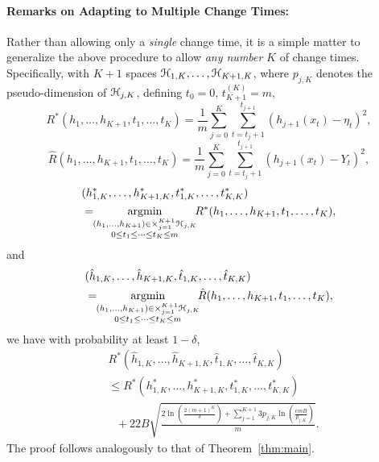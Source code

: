 \documentclass{article}
\begin{document}
\paragraph{Remarks on Adapting to Multiple Change Times:}
Rather than allowing only a \emph{single} change time, it is a simple matter to generalize the above
procedure to allow \emph{any number} $K$ of change times.  Specifically, with $K+1$ spaces $\mathcal H_{1,K},\ldots,\mathcal H_{K+1,K}$,
where $p_{j,K}$ denotes the pseudo-dimension of $\mathcal H_{j,K}$,
defining $t_{0} = 0$, $t_{K+1}^{(K)} = m$, 
\begin{equation*}
R^{*}(h_{1},\ldots,h_{K+1},t_{1},\ldots,t_{K}) 
= \frac{1}{m} \sum_{j = 0}^{K} \sum_{t=t_{j}+1}^{t_{j+1}} ( h_{j+1}(x_{t}) - \eta_{t} )^{2},
\end{equation*}
\begin{equation*}
\hat{R}(h_{1},\ldots,h_{K+1},t_{1},\ldots,t_{K}) 
= \frac{1}{m} \sum_{j=0}^{K} \sum_{t=t_{j}+1}^{t_{j+1}} ( h_{j+1}(x_{t}) - Y_{t} )^{2},
\end{equation*}
\begin{align*}
&(h_{1,K}^{*},\ldots,h_{K+1,K}^{*},t_{1,K}^{*},\ldots,t_{K,K}^{*})\\ 
&= \!\!\mathop{\rm argmin}_{\substack{(h_{1},\ldots,h_{K+1}) \in \times_{j=1}^{K+1} \mathcal H_{j,K} \\ 0 \leq t_{1} \leq \cdots \leq t_{K} \leq m}} \!\!R^{*}(h_{1},\ldots,h_{K+1},t_{1},\ldots,t_{K}),
\end{align*}
and
\begin{align*}
&(\hat{h}_{1,K},\ldots,\hat{h}_{K+1,K},\hat{t}_{1,K},\ldots,\hat{t}_{K,K}) \\
&= \!\!\mathop{\rm argmin}_{\substack{(h_{1},\ldots,h_{K+1}) \in \times_{j=1}^{K+1} \mathcal H_{j,K} \\ 0 \leq t_{1} \leq \cdots \leq t_{K} \leq m}}\!\! \hat{R}(h_{1},\ldots,h_{K+1},t_{1},\ldots,t_{K}),
\end{align*}
we have with probability at least $1-\delta$, 
\begin{align*}
 &R^{*}(\hat{h}_{1,K},\ldots,\hat{h}_{K+1,K},\hat{t}_{1,K},\ldots,\hat{t}_{K,K}) \\
 &\leq R^{*}(h_{1,K}^{*},\ldots,h_{K+1,K}^{*},t_{1,K}^{*},\ldots,t_{K,K}^{*}) \\
 &~~~+ 22 B \sqrt{\frac{2 \ln\left(\frac{2 (m+1)^{K}}{\delta}\right) + \sum\limits_{j=1}^{K+1} 3 p_{j,K} \ln( \frac{e m B}{p_{j,K}} )}{m}}.
\end{align*}
The proof follows analogously to that of Theorem~\ref{thm:main}. 
\end{document}

